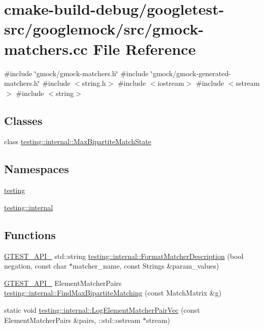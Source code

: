 \hypertarget{gmock-matchers_8cc}{}\section{cmake-\/build-\/debug/googletest-\/src/googlemock/src/gmock-\/matchers.cc File Reference}
\label{gmock-matchers_8cc}
{\ttfamily \#include \char`\"{}gmock/gmock-\/matchers.\+h\char`\"{}}\newline
{\ttfamily \#include \char`\"{}gmock/gmock-\/generated-\/matchers.\+h\char`\"{}}\newline
{\ttfamily \#include $<$string.\+h$>$}\newline
{\ttfamily \#include $<$iostream$>$}\newline
{\ttfamily \#include $<$sstream$>$}\newline
{\ttfamily \#include $<$string$>$}\newline
\subsection*{Classes}
\begin{DoxyCompactItemize}
\item 
class \mbox{\hyperlink{classtesting_1_1internal_1_1MaxBipartiteMatchState}{testing\+::internal\+::\+Max\+Bipartite\+Match\+State}}
\end{DoxyCompactItemize}
\subsection*{Namespaces}
\begin{DoxyCompactItemize}
\item 
 \mbox{\hyperlink{namespacetesting}{testing}}
\item 
 \mbox{\hyperlink{namespacetesting_1_1internal}{testing\+::internal}}
\end{DoxyCompactItemize}
\subsection*{Functions}
\begin{DoxyCompactItemize}
\item 
\mbox{\hyperlink{gtest-port_8h_aa73be6f0ba4a7456180a94904ce17790}{G\+T\+E\+S\+T\+\_\+\+A\+P\+I\+\_\+}} std\+::string \mbox{\hyperlink{namespacetesting_1_1internal_ace0ed89106e622e9b5da449ae269616d}{testing\+::internal\+::\+Format\+Matcher\+Description}} (bool negation, const char $\ast$matcher\+\_\+name, const Strings \&param\+\_\+values)
\item 
\mbox{\hyperlink{gtest-port_8h_aa73be6f0ba4a7456180a94904ce17790}{G\+T\+E\+S\+T\+\_\+\+A\+P\+I\+\_\+}} Element\+Matcher\+Pairs \mbox{\hyperlink{namespacetesting_1_1internal_ae30bd8357c179334b2b09b0d689efccc}{testing\+::internal\+::\+Find\+Max\+Bipartite\+Matching}} (const Match\+Matrix \&g)
\item 
static void \mbox{\hyperlink{namespacetesting_1_1internal_a7e3ffe5f66db16c3ab89de55eac65bfa}{testing\+::internal\+::\+Log\+Element\+Matcher\+Pair\+Vec}} (const Element\+Matcher\+Pairs \&pairs, \+::std\+::ostream $\ast$stream)
\end{DoxyCompactItemize}

